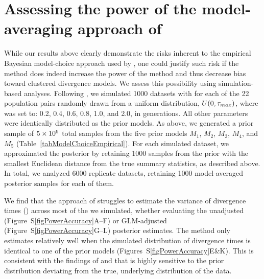 \section{Assessing the power of the model-averaging approach of
    \citet{Hickerson2013}}
While our results above clearly demonstrate the risks inherent to the empirical
Bayesian model-choice approach used by \citet{Hickerson2013}, one could justify
such risk if the method does indeed increase the power of the method and thus
decrease bias toward clustered divergence models.
We assess this possibility using simulation-based analyses.
Following \citet{Oaks2012}, we simulated 1000 datasets with \divt{} for each of
the 22 population pairs randomly drawn from a uniform distribution, $U(0,
\tau_{max})$, where  was set to: 0.2, 0.4, 0.6, 0.8, 1.0, and 2.0, in
\globalcoalunit generations.
All other parameters were identically distributed as the prior models.
As above, we generated a prior sample of $5\times 10^{6}$ total samples from the five
prior models $M_1$, $M_2$, $M_3$, $M_4$, and $M_5$
(Table~\ref{tabModelChoiceEmpirical}).
For each simulated dataset, we approximated the posterior
by retaining 1000 samples from the prior with the smallest Euclidean distance
from the true summary statistics, as described above.
In total, we analyzed 6000 replicate datasets, retaining 1000 model-averaged
posterior samples for each of them.

We find that the approach of \citet{Hickerson2013} struggles to estimate the
variance of divergence times (\vmratio{}) across most of the 
we simulated, whether evaluating the unadjusted
(Figure~S\ref{figPowerAccuracy}A--F) or GLM-adjusted
(Figure~S\ref{figPowerAccuracy}G--L) posterior estimates.
The method only estimates \vmratio{} relatively well when the simulated
distribution of divergence times is identical to one of the prior models
(Figures~S\ref{figPowerAccuracy}E\&K).
This is consistent with the findings of \citet{Oaks2012}  and
\citet{Hickerson2013} that \msb is highly sensitive to the prior distribution
deviating from the true, underlying distribution of the data.

